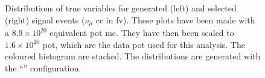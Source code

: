 \begin{figure}[t]
{   \label{fig:mctruth_mumom_sel}} \quad
{} \quad
{} \quad
{} \quad
{} \quad
\caption[Simulated Variables Distributions Before and After Selection]{Distributions of true variables for generated (left) and selected (right) signal events ($\nu_\mu$ \acrshort{cc} in \acrshort{fv}). These plots have been made with a $8.9 \times 10^{20}$ equivalent \acrshort{pot} \acrshort{mc}. They have then been scaled to $1.6\times 10^{20}$ \acrshort{pot}, which are the data \acrshort{pot} used for this analysis. The coloured histogram are stacked. The distributions are generated with the  ``\tuneone'' configuration.}
\label{fig:mctruth_plots}
\end{figure}






